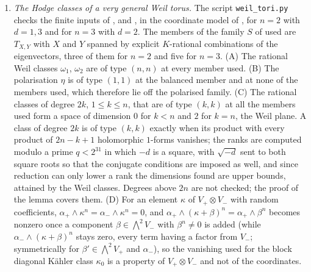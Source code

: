 \begin{enumerate}[label=\textup{(\Roman*)},leftmargin=*]
  $(p,p)$ killed by all $4n^{2}$ monomials of $P\wedge Q$ are exactly
  $\CC\alpha_{+}\oplus\CC\alpha_{-}$. (C) The generators of
  $\bigwedge^{2n}P$ and $\bigwedge^{2n}Q$ contract $\omega$ to nonzero
  multiples of the generator of $H^{0,2n}$; contraction with $\omega$ is
  injective on $\bigwedge^{2n-2}P\oplus\bigwedge^{2n-2}Q$; and the pairing
  $\bigwedge^{2}P\times\bigwedge^{2n-2}P\to\bigwedge^{2n}P$ is perfect.
  (D) The alternating sum of the lower bounds $1,2\binom{2n}{1},\dots,1$ is
  $-2$ for every $n\le60$; at $n=2$ and $n=3$, exhaustive search over the
  admissible profiles shows $2e_{0}\ge\chi+4$, hence $e_{0}\ge3$, lists the
  smallest profiles, and gives $e_{1}\le e_{0}+9$ at $n=3$; at $n=4$ and
  $n=5$ a profile with $e_{0}=1$ satisfies the same constraints, so the bound
  on $\End$ is special to $n\le3$; and the same identity with $\chi=0$ on the
  Mumford square returns the $800$ odd self-extensions of item (XLV).
\item \emph{The Hodge classes of a very general Weil torus.} The script
  \texttt{weil\_\allowbreak tori.py} checks the finite inputs of
  ,  and
  , in the coordinate model of , for
  $n=2$ with $d=1,3$ and for $n=3$ with $d=2$. The members of the family $S$
  of  used are $T_{X,Y}$ with $X$ and $Y$ spanned by
  explicit $K$-rational combinations of the eigenvectors, three of them for
  $n=2$ and five for $n=3$. (A) The rational Weil classes $\omega_{1}$,
  $\omega_{2}$ are of type $(n,n)$ at every member used. (B) The
  polarisation $\eta$ is of type $(1,1)$ at the balanced member and at none of
  the members used, which therefore lie off the polarised family. (C) The
  rational classes of degree $2k$, $1\le k\le n$, that are of type $(k,k)$
  at all the members used form a space of dimension $0$ for $k<n$ and $2$ for
  $k=n$, the Weil plane. A class of degree $2k$ is of type $(k,k)$ exactly
  when its product with every product of $2n-k+1$ holomorphic $1$-forms
  vanishes; the ranks are computed modulo a prime $q<2^{31}$ in which $-d$ is
  a square, with $\sqrt{-d}$ sent to both square roots so that the conjugate
  conditions are imposed as well, and since reduction can only lower a rank
  the dimensions found are upper bounds, attained by the Weil classes. Degrees above
  $2n$ are not checked; the proof of the lemma covers them. (D) For an
  element $\kappa$ of $V_{+}\otimes V_{-}$ with random coefficients,
  $\alpha_{+}\wedge\kappa^{n}=\alpha_{-}\wedge\kappa^{n}=0$, and
  $\alpha_{+}\wedge(\kappa+\beta)^{n}=\alpha_{+}\wedge\beta^{n}$ becomes
  nonzero once a component $\beta\in\bigwedge^{2}V_{-}$ with $\beta^{n}\ne0$
  is added (while $\alpha_{-}\wedge(\kappa+\beta)^{n}$ stays zero, every term
  having a factor from $V_{-}$; symmetrically for $\beta'\in\bigwedge^{2}V_{+}$
  and $\alpha_{-}$), so the vanishing used for the block diagonal K\"ahler
  class $\kappa_{0}$ is a property of $V_{+}\otimes V_{-}$ and not of the
  coordinates.


\end{enumerate}
